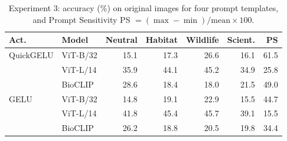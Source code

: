 \begin{table}[t]
\caption{Experiment 3: accuracy (\%) on original images for four prompt templates, and Prompt Sensitivity PS $=(\max-\min)/\text{mean}\times100$.}
\label{tab:prompts}
\centering\footnotesize
\setlength{\tabcolsep}{3pt}
\begin{tabular}{ll rrrr r}
\toprule
Act. & Model & Neutral & Habitat & Wildlife & Scient. & PS \\
\midrule
QuickGELU & ViT-B/32 & 15.1 & 17.3 & 26.6 & 16.1 & 61.5 \\
 & ViT-L/14 & 35.9 & 44.1 & 45.2 & 34.9 & 25.8 \\
 & BioCLIP & 28.6 & 18.4 & 18.0 & 21.5 & 49.0 \\
\midrule
GELU & ViT-B/32 & 14.8 & 19.1 & 22.9 & 15.5 & 44.7 \\
 & ViT-L/14 & 41.8 & 45.4 & 45.7 & 39.1 & 15.5 \\
 & BioCLIP & 26.2 & 18.8 & 20.5 & 19.8 & 34.4 \\
\bottomrule
\end{tabular}
\end{table}
